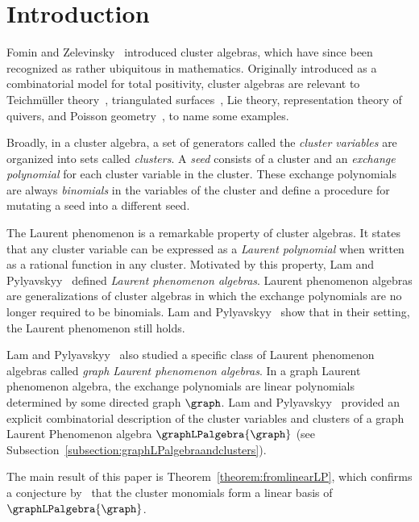 \section{Introduction} \label{section:introduction}


Fomin and Zelevinsky~\cite{clusteralgebrasi} introduced cluster algebras, which have since been recognized as rather ubiquitous in mathematics.
Originally introduced as a combinatorial model for total positivity, cluster algebras are relevant to Teichm\"{u}ller theory~\cite{cluster-teich}, triangulated surfaces~\cite{cluster-triangulated-surface}, Lie theory, representation theory of quivers, and Poisson geometry~\cite{cluster-poisson}, to name some examples.

Broadly, in a cluster algebra, a set of generators called the \textit{cluster variables} are organized into sets called \textit{clusters}. A \textit{seed} consists of a cluster and an \textit{exchange polynomial} for each cluster variable in the cluster. These exchange polynomials are always \emph{binomials} in the variables of the cluster and define a procedure for mutating a seed into a different seed. 

The Laurent phenomenon is a remarkable property of cluster algebras. It states that any cluster variable can be expressed as a \textit{Laurent polynomial} when written as a rational function in any cluster. Motivated by this property, Lam and Pylyavskyy~\cite{LP} defined \emph{Laurent phenomenon algebras}. Laurent phenomenon algebras are generalizations of cluster algebras in which the exchange polynomials are no longer required to be binomials. Lam and Pylyavskyy~\cite{LP} show that in their setting, the Laurent phenomenon still holds. 

Lam and Pylyavskyy~\cite{linearLP} also studied a specific class of Laurent phenomenon algebras called \textit{graph Laurent phenomenon algebras}.
In a graph Laurent phenomenon algebra, the exchange polynomials are linear polynomials determined by some directed graph \(\graph\).
Lam and Pylyavskyy~\cite{linearLP} provided an explicit combinatorial description of the cluster variables and clusters of a graph Laurent Phenomenon algebra \(\graphLPalgebra{\graph}\) (see Subsection~\ref{subsection:graphLPalgebraandclusters}).

The main result of this paper is Theorem~\ref{theorem:fromlinearLP}, which confirms a conjecture by~\cite[Conjecture~7.3a]{linearLP} that the cluster monomials form a linear basis of \(\graphLPalgebra{\graph}\).

